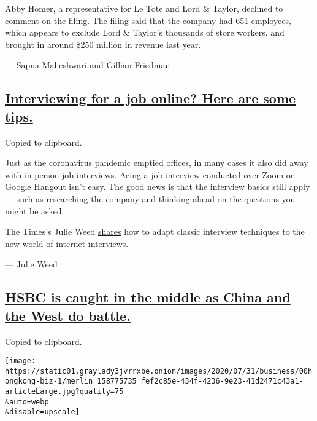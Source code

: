 Abby Homer, a representative for Le Tote and Lord \& Taylor, declined to
comment on the filing. The filing said that the company had 651
employees, which appears to exclude Lord \& Taylor's thousands of store
workers, and brought in around \$250 million in revenue last year.

--- \href{https://www.nytimes3xbfgragh.onion/by/sapna-maheshwari}{Sapna
Maheshwari} and Gillian Friedman

\hypertarget{interviewing-for-a-job-online-here-are-some-tips}{%
\subsection{\texorpdfstring{\protect\hyperlink{interviewing-for-a-job-online-here-are-some-tips}{Interviewing
for a job online? Here are some
tips.}}{Interviewing for a job online? Here are some tips.}}\label{interviewing-for-a-job-online-here-are-some-tips}}

Copied to clipboard.

Just as
\href{https://www.nytimes3xbfgragh.onion/news-event/coronavirus}{the
coronavirus pandemic} emptied offices, in many cases it also did away
with in-person job interviews. Acing a job interview conducted over Zoom
or Google Hangout isn't easy. The good news is that the interview basics
still apply --- such as researching the company and thinking ahead on
the questions you might be asked.

The Times's Julie Weed
\href{https://www.nytimes3xbfgragh.onion/2020/08/03/business/online-job-interview-tips.html}{shares}
how to adapt classic interview techniques to the new world of internet
interviews.

--- Julie Weed

\hypertarget{hsbc-is-caught-in-the-middle-as-china-and-the-west-do-battle}{%
\subsection{\texorpdfstring{\protect\hyperlink{hsbc-is-caught-in-the-middle-as-china-and-the-west-do-battle}{HSBC
is caught in the middle as China and the West do
battle.}}{HSBC is caught in the middle as China and the West do battle.}}\label{hsbc-is-caught-in-the-middle-as-china-and-the-west-do-battle}}

Copied to clipboard.

\texttt{[image: https://static01.graylady3jvrrxbe.onion/images/2020/07/31/business/00hongkong-biz-1/merlin\_158775735\_fef2c85e-434f-4236-9e23-41d2471c43a1-articleLarge.jpg?quality=75\\\&auto=webp\\\&disable=upscale]}

